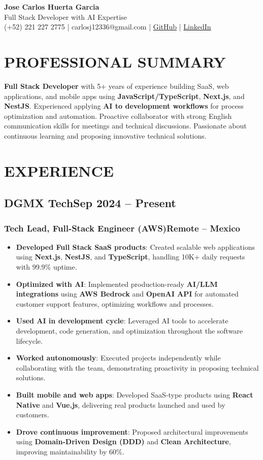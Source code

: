 \documentclass[a4paper,10pt]{article}
\newcommand{\kw}[1]{\textbf{\textcolor{keyword}{#1}}}
\newcommand{\tech}[1]{\textbf{\textcolor{tech}{#1}}}
\begin{document}
\begin{center}
{\bfseries\LARGE Jose Carlos Huerta Garcia} \\
Full Stack Developer with AI Expertise \\
(+52) 221 227 2775 | carlosj12336@gmail.com | \href{https://github.com/jcarloshg}{GitHub} | \href{https://www.linkedin.com/in/jose-carlos-huerta-garcia-773952212}{LinkedIn}
\end{center}

\section*{PROFESSIONAL SUMMARY}
\kw{Full Stack Developer} with 5+ years of experience building SaaS, web applications, and mobile apps using \kw{JavaScript/TypeScript}, \kw{Next.js}, and \kw{NestJS}. Experienced applying \kw{AI to development workflows} for process optimization and automation. Proactive collaborator with strong English communication skills for meetings and technical discussions. Passionate about continuous learning and proposing innovative technical solutions.

\section*{EXPERIENCE}

\subsection*{DGMX Tech\hfill\textbf{Sep 2024 -- Present}}
\subsubsection*{Tech Lead, Full-Stack Engineer (AWS)\hfill Remote -- Mexico}
\begin{itemize}[noitemsep, leftmargin=*]
    \item \textbf{Developed Full Stack SaaS products}: Created scalable web applications using \tech{Next.js}, \tech{NestJS}, and \tech{TypeScript}, handling 10K+ daily requests with 99.9\% uptime.
    \item \textbf{Optimized with AI}: Implemented production-ready \kw{AI/LLM integrations} using \tech{AWS Bedrock} and \kw{OpenAI API} for automated customer support features, optimizing workflows and processes.
    \item \textbf{Used AI in development cycle}: Leveraged AI tools to accelerate development, code generation, and optimization throughout the software lifecycle.
    \item \textbf{Worked autonomously}: Executed projects independently while collaborating with the team, demonstrating proactivity in proposing technical solutions.
    \item \textbf{Built mobile and web apps}: Developed SaaS-type products using \tech{React Native} and \tech{Vue.js}, delivering real products launched and used by customers.
    \item \textbf{Drove continuous improvement}: Proposed architectural improvements using \kw{Domain-Driven Design (DDD)} and \kw{Clean Architecture}, improving maintainability by 60\%.
\end{itemize}
\end{document}
